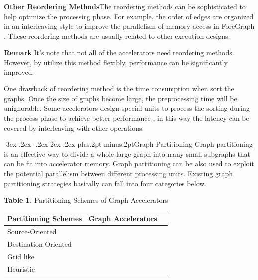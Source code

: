\documentclass[twoside]{article}
\makeatletter
\def\subsection{\@startsection{subsection}{2}{\z@}%
 {-3ex\@plus -.2ex \@minus -.2ex}%
 {2ex \@plus.2ex}%
{\normalfont\normalsize\protect\baselineskip=12.5pt plus.2pt minus.2pt\bfseries}}
\makeatother
\begin{document}
\begin{multicols}{2}
{\bf Other Reordering Methods}\quad The reordering methods can be sophisticated to help optimize the processing phase. For example, the order of edges are organized in an interleaving style to improve the parallelism of memory access in ForeGraph \cite{Dai2017foregraph}. These reordering methods are usually related to other execution designs. 

{\bf Remark} It's note that not all of the accelerators need reordering methods. However, by utilize this method flexibly, performance can be significantly improved.

One drawback of reordering method is the time consumption when sort the graphs. Once the size of graphs become large, the preprocessing time will be unignorable. Some accelerators design special units to process the sorting during the process phase to achieve better performance \cite{song2016novelspmv,yao2018pact,JUN2018GRAFBOOST}, in this way the latency can be covered by interleaving with other operations.

\subsection{Graph Partitioning}
Graph partitioning is an effective way to divide a whole large graph into many small subgraphs that can be fit into accelerator memory. 
Graph partitioning can be also used to exploit the potential parallelism between different processing units. 
Existing graph partitioning strategies basically can fall into four categories below.

\tabcolsep 12pt
\renewcommand\arraystretch{1.3}
\begin{center}
{\footnotesize{\bf Table 1.} Partitioning Schemes of Graph Accelerators}\\
\vspace{2mm}
\footnotesize{
\begin{tabular*}{\linewidth}{lp{4cm}p{4cm}}\hline\hline\hline
Partitioning Schemes & Graph Accelerators
\\\hline
Source-Oriented & {\cite{9,11,15,22,29,34,40}} \\
Destination-Oriented &  {\cite{1,4,12,13,26}} \\
Grid like & {\cite{10,30,39}} \\
Heuristic & {\cite{2,5,6,7,25,37,38}}
\\\hline\hline\hline
\end{tabular*}%
\\\vspace{1mm}\parbox{8.3cm}{}
}
\end{center}


\end{multicols}
\end{document}
